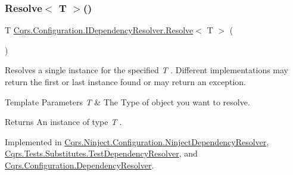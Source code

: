 \mbox{\label{interfaceCqrs_1_1Configuration_1_1IDependencyResolver_a9dc7694a365209a5ef05270a7cfa7b6b_a9dc7694a365209a5ef05270a7cfa7b6b}} 
\subsubsection{\texorpdfstring{Resolve$<$ T $>$()}{Resolve< T >()}}
{\footnotesize\ttfamily T \hyperlink{interfaceCqrs_1_1Configuration_1_1IDependencyResolver_aa455096b7b94fc1d64904bc67830ec06_aa455096b7b94fc1d64904bc67830ec06}{Cqrs.\+Configuration.\+I\+Dependency\+Resolver.\+Resolve}$<$ T $>$ (\begin{DoxyParamCaption}{ }\end{DoxyParamCaption})}



Resolves a single instance for the specified {\itshape T} . Different implementations may return the first or last instance found or may return an exception. 


\begin{DoxyTemplParams}{Template Parameters}
{\em T} & The Type of object you want to resolve.\\
\hline
\end{DoxyTemplParams}
\begin{DoxyReturn}{Returns}
An instance of type {\itshape T} .
\end{DoxyReturn}


Implemented in \hyperlink{classCqrs_1_1Ninject_1_1Configuration_1_1NinjectDependencyResolver_ab044ba98051bdd3111e0c1be6259de10_ab044ba98051bdd3111e0c1be6259de10}{Cqrs.\+Ninject.\+Configuration.\+Ninject\+Dependency\+Resolver}, \hyperlink{classCqrs_1_1Tests_1_1Substitutes_1_1TestDependencyResolver_a67090a882241fa6a881d49c91c95cad7_a67090a882241fa6a881d49c91c95cad7}{Cqrs.\+Tests.\+Substitutes.\+Test\+Dependency\+Resolver}, and \hyperlink{classCqrs_1_1Configuration_1_1DependencyResolver_a1eb177fc6c914b45d138642fb6d9454d_a1eb177fc6c914b45d138642fb6d9454d}{Cqrs.\+Configuration.\+Dependency\+Resolver}.

